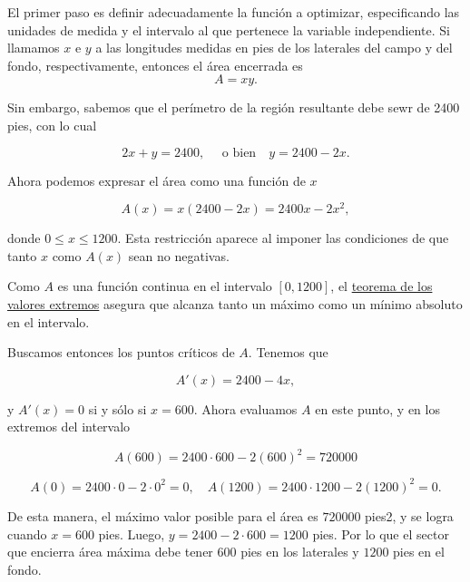 \documentclass[
  letterpaper,
]{book}
\theoremstyle{plain}
\theoremstyle{remark}
\begin{document}
\begin{tcolorbox}[enhanced jigsaw, opacityback=0, left=2mm, opacitybacktitle=0.6, toprule=.15mm, bottomrule=.15mm, colbacktitle=quarto-callout-tip-color!10!white, titlerule=0mm, bottomtitle=1mm, title=\textcolor{quarto-callout-tip-color}{\faLightbulb}\hspace{0.5em}{Solución}, toptitle=1mm, colframe=quarto-callout-tip-color-frame, colback=white, breakable, rightrule=.15mm, arc=.35mm, leftrule=.75mm, coltitle=black]

El primer paso es definir adecuadamente la función a optimizar,
especificando las unidades de medida y el intervalo al que pertenece la
variable independiente. Si llamamos \(x\) e \(y\) a las longitudes
medidas en pies de los laterales del campo y del fondo, respectivamente,
entonces el área encerrada es \[
A=xy.
\]

Sin embargo, sabemos que el perímetro de la región resultante debe sewr
de 2400 pies, con lo cual

\[
2x+y=2400, \quad \text{ o bien} \quad y=2400-2x.
\]

Ahora podemos expresar el área como una función de \(x\)

\[
A(x)=x(2400-2x)=2400x-2x^2,
\]

donde \(0\leq x\leq 1200\). Esta restricción aparece al imponer las
condiciones de que tanto \(x\) como \(A(x)\) sean no negativas.

Como \(A\) es una función continua en el intervalo \([0,1200]\), el
\hyperref[teo-valores-extremos]{teorema de los valores extremos} asegura
que alcanza tanto un máximo como un mínimo absoluto en el intervalo.

Buscamos entonces los puntos críticos de \(A\). Tenemos que

\[
A'(x)=2400-4x,
\]

y \(A'(x)=0\) si y sólo si \(x=600\). Ahora evaluamos \(A\) en este
punto, y en los extremos del intervalo

\[
A(600)=2400\cdot 600-2(600)^2=720000
\]

\[
 A(0)=2400\cdot 0 - 2\cdot 0^2=0, \quad A(1200)=2400\cdot 1200- 2(1200)^2=0.
\]

De esta manera, el máximo valor posible para el área es \(720000\)
pies2, y se logra cuando \(x=600\) pies. Luego,
\(y=2400-2\cdot 600=1200\) pies. Por lo que el sector que encierra área
máxima debe tener \(600\) pies en los laterales y \(1200\) pies en el
fondo.

\end{tcolorbox}
\end{document}
